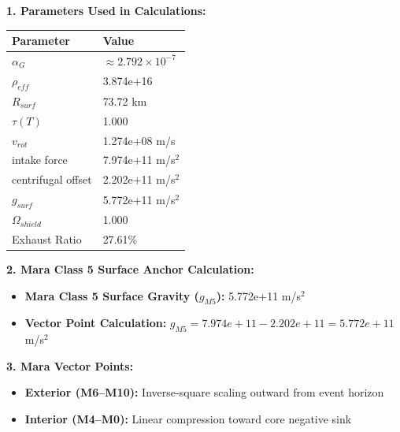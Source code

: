 \documentclass[11pt, a4paper]{article}
\begin{document}
\vspace{0.5em}
\noindent \textbf{1. Parameters Used in Calculations:}
\begin{center}
  \begin{tabular}{|l|l|}
    \hline
    \textbf{Parameter} & \textbf{Value} \\ \hline
    $\alpha_G$ & $\approx 2.792 \times 10^{-7}$ \\ \hline
    $\rho_{eff}$ & 3.874e+16 \\ \hline
    $R_{surf}$ & 73.72 km \\ \hline
    $\tau(T)$ & 1.000 \\ \hline
    $v_{rot}$ & 1.274e+08 m/s \\ \hline
    intake force & 7.974e+11 m/s$^2$ \\ \hline
    centrifugal offset & 2.202e+11 m/s$^2$ \\ \hline
    $g_{surf}$ & 5.772e+11 m/s$^2$ \\ \hline
    $\Omega_{shield}$ & 1.000 \\ \hline
    Exhaust Ratio & 27.61\% \\ \hline
  \end{tabular}
\end{center}

\vspace{0.5em}
\noindent \textbf{2. Mara Class 5 Surface Anchor Calculation:}
\begin{itemize}
  \item \textbf{Mara Class 5 Surface Gravity ($g_{M5}$):} 5.772e+11 m/s$^2$
  \item \textbf{Vector Point Calculation:} $g_{M5} = 7.974e+11 - 2.202e+11 = 5.772e+11$ m/s$^2$
\end{itemize}

\vspace{0.5em}
\noindent \textbf{3. Mara Vector Points:}
\begin{itemize}
  \item \textbf{Exterior (M6--M10):} Inverse-square scaling outward from event horizon
  \item \textbf{Interior (M4--M0):} Linear compression toward core negative sink
\end{itemize}
\end{document}
